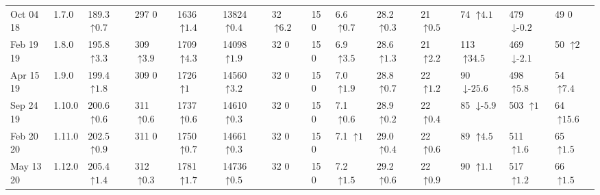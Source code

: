 \begin{tabular}{ll|llllll|lll|lll}
Oct 04 18 & 1.7.0 & 189.3 {\tiny $\uparrow\text{0.7}$} & 297 {\tiny $\text{0}$} & 1636 {\tiny $\uparrow\text{1.4}$} & 13824 {\tiny $\uparrow\text{0.4}$} & 32 {\tiny $\uparrow\text{6.2}$} & 15 {\tiny $\text{0}$} & 6.6 {\tiny $\uparrow\text{0.7}$} & 28.2 {\tiny $\uparrow\text{0.3}$} & 21 {\tiny $\uparrow\text{0.5}$} & 74 {\tiny $\uparrow\text{4.1}$} & 479 {\tiny $\downarrow\text{-}\text{0.2}$} & 49 {\tiny $\text{0}$} \\
Feb 19 19 & 1.8.0 & 195.8 {\tiny $\uparrow\text{3.3}$} & 309 {\tiny $\uparrow\text{3.9}$} & 1709 {\tiny $\uparrow\text{4.3}$} & 14098 {\tiny $\uparrow\text{1.9}$} & 32 {\tiny $\text{0}$} & 15 {\tiny $\text{0}$} & 6.9 {\tiny $\uparrow\text{3.5}$} & 28.6 {\tiny $\uparrow\text{1.3}$} & 21 {\tiny $\uparrow\text{2.2}$} & 113 {\tiny $\uparrow\text{34.5}$} & 469 {\tiny $\downarrow\text{-}\text{2.1}$} & 50 {\tiny $\uparrow\text{2}$} \\
Apr 15 19 & 1.9.0 & 199.4 {\tiny $\uparrow\text{1.8}$} & 309 {\tiny $\text{0}$} & 1726 {\tiny $\uparrow\text{1}$} & 14560 {\tiny $\uparrow\text{3.2}$} & 32 {\tiny $\text{0}$} & 15 {\tiny $\text{0}$} & 7.0 {\tiny $\uparrow\text{1.9}$} & 28.8 {\tiny $\uparrow\text{0.7}$} & 22 {\tiny $\uparrow\text{1.2}$} & 90 {\tiny $\downarrow\text{-}\text{25.6}$} & 498 {\tiny $\uparrow\text{5.8}$} & 54 {\tiny $\uparrow\text{7.4}$} \\
Sep 24 19 & 1.10.0 & 200.6 {\tiny $\uparrow\text{0.6}$} & 311 {\tiny $\uparrow\text{0.6}$} & 1737 {\tiny $\uparrow\text{0.6}$} & 14610 {\tiny $\uparrow\text{0.3}$} & 32 {\tiny $\text{0}$} & 15 {\tiny $\text{0}$} & 7.1 {\tiny $\uparrow\text{0.6}$} & 28.9 {\tiny $\uparrow\text{0.2}$} & 22 {\tiny $\uparrow\text{0.4}$} & 85 {\tiny $\downarrow\text{-}\text{5.9}$} & 503 {\tiny $\uparrow\text{1}$} & 64 {\tiny $\uparrow\text{15.6}$} \\
Feb 20 20 & 1.11.0 & 202.5 {\tiny $\uparrow\text{0.9}$} & 311 {\tiny $\text{0}$} & 1750 {\tiny $\uparrow\text{0.7}$} & 14661 {\tiny $\uparrow\text{0.3}$} & 32 {\tiny $\text{0}$} & 15 {\tiny $\text{0}$} & 7.1 {\tiny $\uparrow\text{1}$} & 29.0 {\tiny $\uparrow\text{0.4}$} & 22 {\tiny $\uparrow\text{0.6}$} & 89 {\tiny $\uparrow\text{4.5}$} & 511 {\tiny $\uparrow\text{1.6}$} & 65 {\tiny $\uparrow\text{1.5}$} \\
May 13 20 & 1.12.0 & 205.4 {\tiny $\uparrow\text{1.4}$} & 312 {\tiny $\uparrow\text{0.3}$} & 1781 {\tiny $\uparrow\text{1.7}$} & 14736 {\tiny $\uparrow\text{0.5}$} & 32 {\tiny $\text{0}$} & 15 {\tiny $\text{0}$} & 7.2 {\tiny $\uparrow\text{1.5}$} & 29.2 {\tiny $\uparrow\text{0.6}$} & 22 {\tiny $\uparrow\text{0.9}$} & 90 {\tiny $\uparrow\text{1.1}$} & 517 {\tiny $\uparrow\text{1.2}$} & 66 {\tiny $\uparrow\text{1.5}$} \\

\end{tabular}

